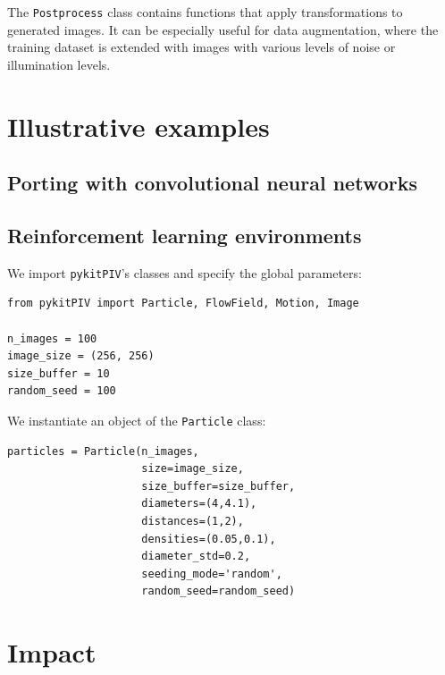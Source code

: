 \documentclass[a4paper,fleqn]{cas-dc}
\newcommand{ \kamila}[1]{\color{blue}{Kamila: #1} \color{black}}
\begin{document}
The \texttt{Postprocess} class contains functions that apply transformations to generated images. It can be especially useful for data augmentation, where the training dataset is extended with images with various levels of noise or illumination levels.

\section{Illustrative examples} \label{sec:examples}

\subsection{Porting with convolutional neural networks}

\kamila{Here we can describe what can be achieved in terms of training a CNN.}

\subsection{Reinforcement learning environments}

\kamila{Here we can describe what can be achieved in terms of training an RL agent, e.g. in the context of autonomous experimentation. Maybe the agent will learn to augment the dataset in real time to account for changing experimental settings.}

We import \texttt{pykitPIV}'s classes and specify the global parameters:
\lstset{language=Python}
\begin{lstlisting}
from pykitPIV import Particle, FlowField, Motion, Image

n_images = 100
image_size = (256, 256)
size_buffer = 10
random_seed = 100
\end{lstlisting}
We instantiate an object of the \texttt{Particle} class:
\lstset{language=Python}
\begin{lstlisting}
particles = Particle(n_images,
                     size=image_size,
                     size_buffer=size_buffer,
                     diameters=(4,4.1),
                     distances=(1,2),
                     densities=(0.05,0.1),
                     diameter_std=0.2,
                     seeding_mode='random',
                     random_seed=random_seed)
\end{lstlisting}


\section{Impact} \label{sec:results}
\end{document}
